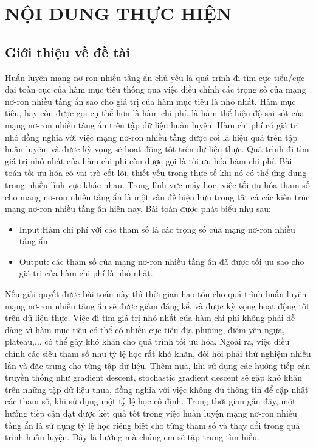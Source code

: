 \documentclass{article}[14pt]
\begin{document}
    \section{NỘI DUNG THỰC HIỆN}
    {

    
    \subsection{Giới thiệu về đề tài}
    
  Huấn luyện mạng nơ-ron nhiều tầng ẩn chủ yếu là quá trình đi tìm cực tiểu/cực đại toàn cục của hàm mục tiêu thông qua việc điều chỉnh các trọng số của mạng nơ-ron nhiều tầng ẩn sao cho giá trị của hàm mục tiêu là nhỏ nhất. Hàm mục tiêu, hay còn được gọi cụ thể hơn là hàm chi phí, là hàm thể hiện độ sai sót của mạng nơ-ron nhiều tầng ẩn trên tập dữ liệu huấn luyện. Hàm  chi phí có giá trị nhỏ đồng nghĩa với việc mạng nơ-ron nhiều tầng được coi là hiệu quả trên tập huấn luyện, và được kỳ vọng sẽ hoạt động tốt trên dữ liệu thực. Quá trình đi tìm giá trị nhỏ nhất của hàm chi phí còn được gọi là tối ưu hóa hàm chi phí. Bài toán tối ưu hóa có vai trò cốt lõi, thiết yếu trong thực tế khi nó có thể ứng dụng trong nhiều lĩnh vực khác nhau. Trong lĩnh vực máy học, việc tối ưu hóa tham số cho mang nơ-ron nhiều tầng ẩn là một vấn đề hiện hữu trong tất cả các kiến trúc mạng nơ-ron nhiều tầng ẩn hiện nay. Bài toán được phát biểu như sau:
   \begin{itemize}
      \item Input:Hàm chi phí với các tham số là các trọng số của mạng nơ-ron nhiều tầng ẩn.
      \item Output: các tham số của mạng nơ-ron nhiều tầng ẩn đã được tối ưu sao cho giá trị của hàm chi phí là nhỏ nhất.
    \end{itemize}
    
   Nếu giải quyết được bài toán này thì thời gian hao tổn cho quá trình huấn luyện mạng nơ-ron nhiều tầng ẩn sẽ được giảm đáng kể, và được kỳ vọng hoạt động tốt trên dữ liệu thực. Việc đi tìm giá trị nhỏ nhất của hàm chi phí không phải dễ dàng vì hàm mục tiêu có thể có nhiều cực tiểu địa phương, điểm yên ngựa, plateau,... có thể gây khó khăn cho quá trình tối ưu hóa. Ngoài ra, việc điều chỉnh các siêu tham số như tỷ lệ học rất khó khăn, đòi hỏi phải thử nghiệm nhiều lần và đặc trưng cho từng tập dữ liệu. Thêm nữa, khi sử dụng các hướng tiếp cận truyền thống như gradient descent, stochastic gradient descent sẽ gặp khó khăn trên những tập dữ liệu thưa, đồng nghĩa với việc không đủ thông tin để cập nhật các tham số, khi sử dụng một tỷ lệ học cố định.
   Trong thời gian gần đây, một hướng tiếp cận đạt được kết quả tốt trong việc huấn luyện mạng nơ-ron nhiều tầng ẩn là sử dụng tỷ lệ học riêng biệt cho từng tham số và thay đổi trong quá trình huấn luyện. Đây là hướng mà chúng em sẽ tập trung tìm hiểu.
    
}
\end{document}
